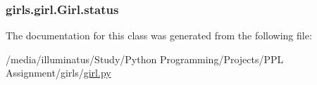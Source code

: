 \subsubsection[{\texorpdfstring{status}{status}}]{\setlength{\rightskip}{0pt plus 5cm}girls.\+girl.\+Girl.\+status}\hypertarget{classgirls_1_1girl_1_1_girl_a13abe6f47843d4dbb5b440a8d0a3962c}{}\label{classgirls_1_1girl_1_1_girl_a13abe6f47843d4dbb5b440a8d0a3962c}


The documentation for this class was generated from the following file\+:\begin{DoxyCompactItemize}
\item 
/media/illuminatus/\+Study/\+Python Programming/\+Projects/\+P\+P\+L Assignment/girls/\hyperlink{girl_8py}{girl.\+py}\end{DoxyCompactItemize}
